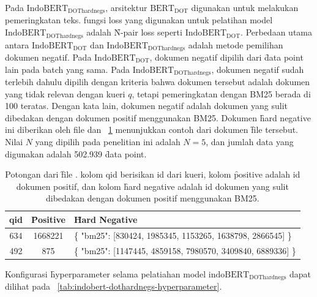 Pada $\text{IndoBERT}_\text{DOThardnegs}$, arsitektur $\text{BERT}_\text{DOT}$ digunakan untuk melakukan pemeringkatan teks. fungsi loss yang digunakan untuk pelatihan model $\text{IndoBERT}_{\text{DOThardnegs}}$ adalah \f{N-pair loss} seperti $\text{IndoBERT}_{\text{DOT}}$. Perbedaan utama antara $\text{IndoBERT}_{\text{DOT}}$ dan $\text{IndoBERT}_{\text{DOThardnegs}}$ adalah metode pemilihan dokumen negatif. Pada $\text{IndoBERT}_{\text{DOT}}$, dokumen negatif dipilih dari \f{data point} lain pada batch yang sama. Pada $\text{IndoBERT}_{\text{DOThardnegs}}$, dokumen negatif sudah terlebih dahulu dipilih dengan kriteria bahwa dokumen tersebut adalah dokumen yang tidak relevan dengan kueri $q$, tetapi pemeringkatan dengan BM25 berada di 100 teratas. Dengan kata lain, dokumen negatif adalah dokumen yang sulit dibedakan dengan dokumen positif menggunakan BM25. Dokumen \f{hard negative} ini diberikan oleh file \href{https://huggingface.co/datasets/sentence-transformers/msmarco-hard-negatives}{} \citep{beir} dan \tab~\ref{tab:hardnegsbm25} menunjukkan contoh dari dokumen \f{file} tersebut. Nilai $N$ yang dipilih pada penelitian ini adalah $N=5$, dan jumlah data yang digunakan adalah 502.939 \f{data point}.

\begin{table}[!ht]
    \centering
    \caption{Potongan dari \f{file} . kolom qid berisikan id dari kueri, kolom \f{positive} adalah id dokumen positif, dan kolom \f{hard negative} adalah id dokumen yang sulit dibedakan dengan dokumen positif menggunakan BM25.}
    \label{tab:hardnegsbm25}
    \begin{tabular}{|c|c|p{8cm}|}
        \hline
        qid & \f{Positive} & \f{Hard Negative}                                           \\
        \hline
        634 & 1668221      & \{ "bm25": [830424, 1985345, 1153265, 1638798, 2866545] \}  \\
        \hline
        492 & 875          & \{ "bm25": [1147445, 4859158, 7980570, 3409840, 6889336] \} \\
        \hline
    \end{tabular}
\end{table}

Konfigurasi \f{hyperparameter} selama pelatiahan model $\text{indoBERT}_{\text{DOThardnegs}}$ dapat  dilihat pada \tab~\ref{tab:indobert-dothardnegs-hyperparameter}.

